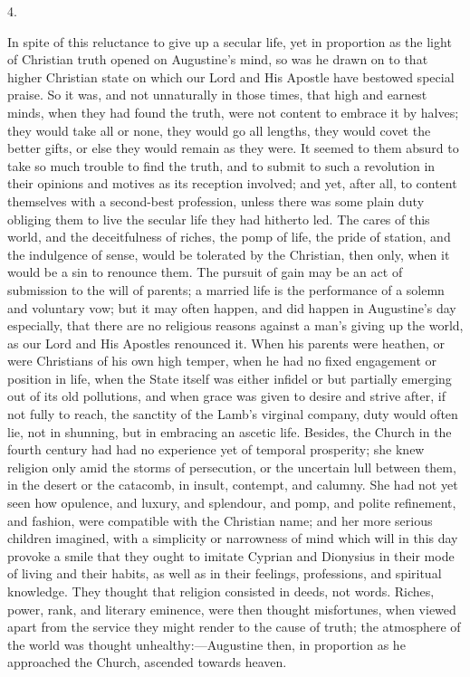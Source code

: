 4.

In spite of this reluctance to give up a secular life, yet in
proportion as the light of Christian truth opened on Augustine's mind,
so was he drawn on to that higher Christian state on which our Lord
and His Apostle have bestowed special praise. So it was, and not
unnaturally in those times, that high and earnest minds, when they had
found the truth, were not content to embrace it by halves; they would
take all or none, they would go all lengths, they would covet the
better gifts, or else they would remain as they were. It seemed to
them absurd to take so much trouble to find the truth, and to submit
to such a revolution in their opinions and motives as its reception
involved; and yet, after all, to content themselves with a second-best
profession, unless there was some plain duty obliging them to live the
secular life they had hitherto led. The cares of this world, and the
deceitfulness of riches, the pomp of life, the pride of station, and
the indulgence of sense, would be tolerated by the Christian, then
only, when it would be a sin to renounce them. The pursuit of gain may
be an act of submission to the will of parents; a married life is the
performance of a solemn and voluntary vow; but it may often happen,
and did happen in Augustine's day especially, that there are no
religious reasons against a man's giving up the world, as our Lord and
His Apostles renounced it. When his parents were heathen, or were
Christians of his own high temper, when he had no fixed engagement or position in life, when the State itself was either
infidel or but partially emerging out of its old pollutions, and when
grace was given to desire and strive after, if not fully to reach, the
sanctity of the Lamb's virginal company, duty would often lie, not in
shunning, but in embracing an ascetic life. Besides, the Church in the
fourth century had had no experience yet of temporal prosperity; she
knew religion only amid the storms of persecution, or the uncertain
lull between them, in the desert or the catacomb, in insult, contempt,
and calumny. She had not yet seen how opulence, and luxury, and
splendour, and pomp, and polite refinement, and fashion, were
compatible with the Christian name; and her more serious children
imagined, with a simplicity or narrowness of mind which will in this
day provoke a smile that they ought to imitate Cyprian and Dionysius
in their mode of living and their habits, as well as in their
feelings, professions, and spiritual knowledge. They thought that
religion consisted in deeds, not words. Riches, power, rank, and
literary eminence, were then thought misfortunes, when viewed apart
from the service they might render to the cause of truth; the
atmosphere of the world was thought unhealthy:—Augustine then, in
proportion as he approached the Church, ascended towards heaven.

